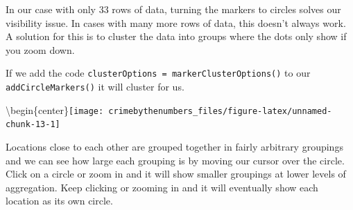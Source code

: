 \documentclass[
]{krantz}
\makeatletter
\newenvironment{Shaded}{\begin{snugshade}}{\end{snugshade}}
\newcommand{\AttributeTok}[1]{\textcolor[rgb]{0.61,0.61,0.61}{#1}}
\newcommand{\DecValTok}[1]{\textcolor[rgb]{0.06,0.06,0.06}{#1}}
\newcommand{\FunctionTok}[1]{\textcolor[rgb]{0,0,0}{#1}}
\newcommand{\NormalTok}[1]{#1}
\newcommand{\SpecialCharTok}[1]{\textcolor[rgb]{0,0,0}{#1}}
\newcommand{\StringTok}[1]{\textcolor[rgb]{0.5,0.5,0.5}{#1}}
\newenvironment{kframe}{%
\medskip{}
\setlength{\fboxsep}{.8em}
 \def\at@end@of@kframe{}%
 \ifinner\ifhmode%
  \def\at@end@of@kframe{\end{minipage}}%
  \begin{minipage}{\columnwidth}%
 \fi\fi%
 \def\FrameCommand##1{\hskip\@totalleftmargin \hskip-\fboxsep
 \colorbox{shadecolor}{##1}\hskip-\fboxsep
     \hskip-\linewidth \hskip-\@totalleftmargin \hskip\columnwidth}%
 \MakeFramed {\advance\hsize-\width
   \@totalleftmargin\z@ \linewidth\hsize
   \@setminipage}}%
 {\par\unskip\endMakeFramed%
 \at@end@of@kframe}
\renewenvironment{Shaded}{\begin{kframe}}{\end{kframe}}
\makeatother
\begin{document}
In our case with only 33 rows of data, turning the markers to circles solves our visibility issue. In cases with many more rows of data, this doesn't always work. A solution for this is to cluster the data into groups where the dots only show if you zoom down.

If we add the code \texttt{clusterOptions\ =\ markerClusterOptions()} to our \texttt{addCircleMarkers()} it will cluster for us.

\begin{Shaded}
\end{Shaded}

\textbackslash begin\{center\}\texttt{[image: crimebythenumbers\_files/figure-latex/unnamed-chunk-13-1]}

Locations close to each other are grouped together in fairly arbitrary groupings and we can see how large each grouping is by moving our cursor over the circle. Click on a circle or zoom in and it will show smaller groupings at lower levels of aggregation. Keep clicking or zooming in and it will eventually show each location as its own circle.
\end{document}
